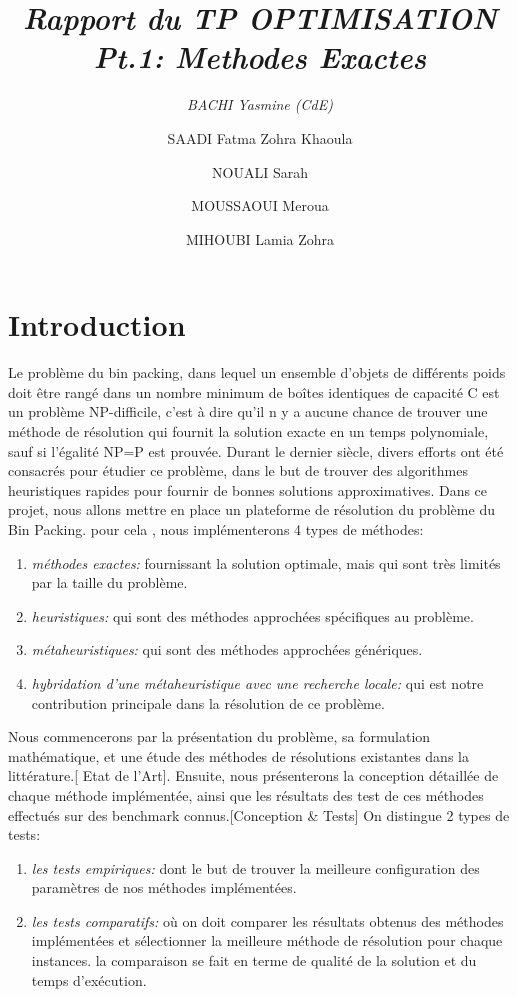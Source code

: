 \documentclass[12pt,a4paper, titlepage]{report}
\title{\emph{Rapport du TP OPTIMISATION Pt.1: Methodes Exactes} }
\author{ 
    \emph{BACHI Yasmine (CdE)}
    \and
    SAADI Fatma Zohra Khaoula
    \and 
    NOUALI Sarah
    \and 
    MOUSSAOUI Meroua
    \and 
    MIHOUBI Lamia Zohra}
\begin{document}
    \maketitle
    \tableofcontents
    \chapter*{Introduction}
      
    Le problème du bin packing, dans lequel un ensemble d’objets de différents poids doit être rangé dans un nombre minimum de boîtes identiques de capacité C est un problème NP-difficile, c’est à dire qu’il n y a aucune chance de trouver une méthode de résolution qui fournit la solution exacte en un temps polynomiale, sauf si l’égalité NP=P est prouvée. 
    Durant le dernier siècle, divers efforts ont été consacrés pour étudier ce problème, dans le but de trouver des algorithmes heuristiques rapides pour fournir de bonnes solutions approximatives.
    Dans ce projet, nous allons mettre en place un plateforme de résolution du problème du Bin Packing. pour cela , nous implémenterons 4 types de méthodes: 
    \begin{enumerate}
        \item \emph{méthodes exactes:} fournissant la solution optimale, mais qui sont très limités par la taille du problème. 
        \item \emph{heuristiques:} qui sont des méthodes approchées spécifiques au problème.
        \item \emph{métaheuristiques:} qui sont des méthodes approchées génériques.
        \item \emph{hybridation d'une métaheuristique avec une recherche locale:} qui est notre contribution principale dans la résolution de ce problème.
    \end{enumerate}
    Nous commencerons par la présentation du problème, sa formulation mathématique, et une étude des méthodes de résolutions existantes dans la littérature.[ Etat de l’Art]. Ensuite, nous présenterons la conception détaillée de chaque méthode implémentée, ainsi que les résultats des test de ces méthodes effectués sur des benchmark connus.[Conception \& Tests]
    On distingue 2 types de tests:
    \begin{enumerate}
        \item \emph{les tests empiriques:} dont le but de trouver la meilleure configuration des paramètres de nos méthodes implémentées.  
        \item \emph{les tests comparatifs:} où on doit comparer les résultats obtenus des méthodes implémentées et sélectionner la meilleure méthode de résolution pour chaque instances. la comparaison se fait en terme de qualité de la solution et du temps d'exécution. 
    \end{enumerate}
\end{document}
